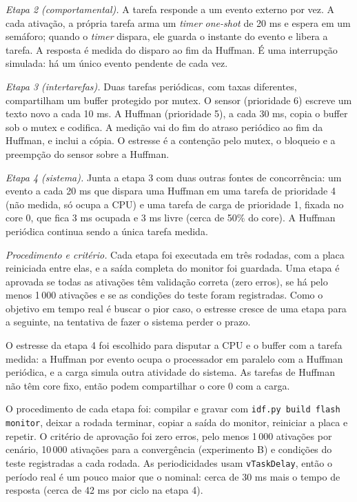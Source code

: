 \documentclass[conference,a4paper]{IEEEtran}
\begin{document}
\emph{Etapa 2 (comportamental).} A tarefa responde a um evento externo por vez. A cada ativação, a própria tarefa arma um \emph{timer} \emph{one-shot} de 20 ms e espera em um semáforo; quando o \emph{timer} dispara, ele guarda o instante do evento e libera a tarefa. A resposta é medida do disparo ao fim da Huffman. É uma interrupção simulada: há um único evento pendente de cada vez.

\emph{Etapa 3 (intertarefas).} Duas tarefas periódicas, com taxas diferentes, compartilham um buffer protegido por mutex. O sensor (prioridade 6) escreve um texto novo a cada 10 ms. A Huffman (prioridade 5), a cada 30 ms, copia o buffer sob o mutex e codifica. A medição vai do fim do atraso periódico ao fim da Huffman, e inclui a cópia. O estresse é a contenção pelo mutex, o bloqueio e a preempção do sensor sobre a Huffman.

\emph{Etapa 4 (sistema).} Junta a etapa 3 com duas outras fontes de concorrência: um evento a cada 20 ms que dispara uma Huffman em uma tarefa de prioridade 4 (não medida, só ocupa a CPU) e uma tarefa de carga de prioridade 1, fixada no core 0, que fica 3 ms ocupada e 3 ms livre (cerca de 50\% do core). A Huffman periódica continua sendo a única tarefa medida.

\emph{Procedimento e critério.} Cada etapa foi executada em três rodadas, com a placa reiniciada entre elas, e a saída completa do monitor foi guardada. Uma etapa é aprovada se todas as ativações têm validação correta (zero erros), se há pelo menos 1\,000 ativações e se as condições do teste foram registradas. Como o objetivo em tempo real é buscar o pior caso, o estresse cresce de uma etapa para a seguinte, na tentativa de fazer o sistema perder o prazo.

O estresse da etapa 4 foi escolhido para disputar a CPU e o buffer com a tarefa medida: a Huffman por evento ocupa o processador em paralelo com a Huffman periódica, e a carga simula outra atividade do sistema. As tarefas de Huffman não têm core fixo, então podem compartilhar o core 0 com a carga.

O procedimento de cada etapa foi: compilar e gravar com \texttt{idf.py build flash monitor}, deixar a rodada terminar, copiar a saída do monitor, reiniciar a placa e repetir. O critério de aprovação foi zero erros, pelo menos 1\,000 ativações por cenário, 10\,000 ativações para a convergência (experimento B) e condições do teste registradas a cada rodada. As periodicidades usam \texttt{vTaskDelay}, então o período real é um pouco maior que o nominal: cerca de 30 ms mais o tempo de resposta (cerca de 42 ms por ciclo na etapa 4).
\end{document}
